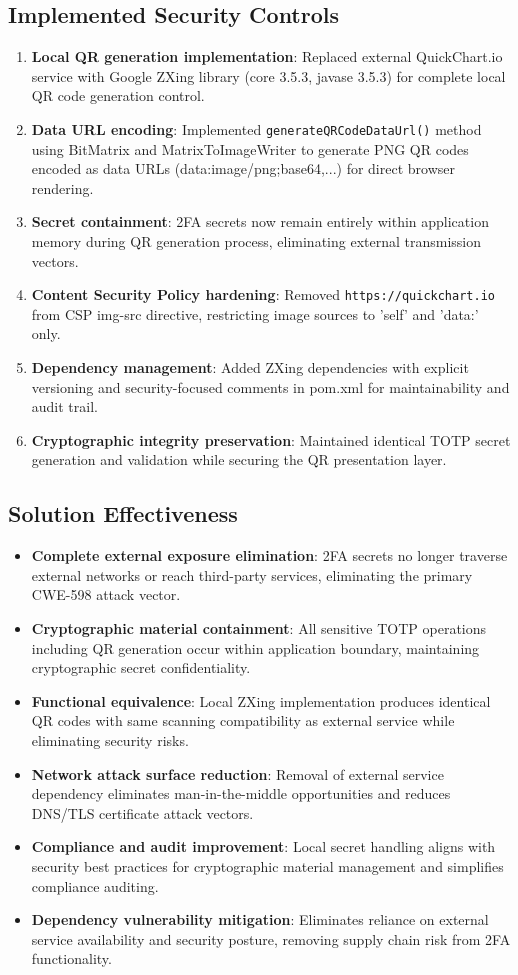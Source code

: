 \documentclass[]{UCD_CS_FYP_Report}
\begin{document}
\subsection{Implemented Security Controls}
\begin{enumerate}
	\item \textbf{Local QR generation implementation}: Replaced external QuickChart.io service with Google ZXing library (core 3.5.3, javase 3.5.3) for complete local QR code generation control.
	\item \textbf{Data URL encoding}: Implemented \texttt{generateQRCodeDataUrl()} method using BitMatrix and MatrixToImageWriter to generate PNG QR codes encoded as data URLs (data:image/png;base64,...) for direct browser rendering.
	\item \textbf{Secret containment}: 2FA secrets now remain entirely within application memory during QR generation process, eliminating external transmission vectors.
	\item \textbf{Content Security Policy hardening}: Removed \texttt{https://quickchart.io} from CSP img-src directive, restricting image sources to 'self' and 'data:' only.
	\item \textbf{Dependency management}: Added ZXing dependencies with explicit versioning and security-focused comments in pom.xml for maintainability and audit trail.
	\item \textbf{Cryptographic integrity preservation}: Maintained identical TOTP secret generation and validation while securing the QR presentation layer.
\end{enumerate}

\subsection{Solution Effectiveness}
\begin{itemize}
	\item \textbf{Complete external exposure elimination}: 2FA secrets no longer traverse external networks or reach third-party services, eliminating the primary CWE-598 attack vector.
	\item \textbf{Cryptographic material containment}: All sensitive TOTP operations including QR generation occur within application boundary, maintaining cryptographic secret confidentiality.
	\item \textbf{Functional equivalence}: Local ZXing implementation produces identical QR codes with same scanning compatibility as external service while eliminating security risks.
	\item \textbf{Network attack surface reduction}: Removal of external service dependency eliminates man-in-the-middle opportunities and reduces DNS/TLS certificate attack vectors.
	\item \textbf{Compliance and audit improvement}: Local secret handling aligns with security best practices for cryptographic material management and simplifies compliance auditing.
	\item \textbf{Dependency vulnerability mitigation}: Eliminates reliance on external service availability and security posture, removing supply chain risk from 2FA functionality.
\end{itemize}
\end{document}
